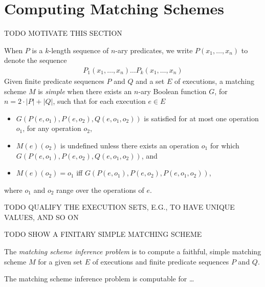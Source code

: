 \section{Computing Matching Schemes}
\label{sec:matching}

TODO MOTIVATE THIS SECTION

When $P$ is a $k$-length sequence of $n$-ary predicates, we write $P(x_1,
\ldots, x_n)$ to denote the sequence
\begin{align*}
  P_1(x_1, \ldots, x_n) \ldots P_k(x_1, \ldots, x_n)
\end{align*}
Given finite predicate sequences $P$ and $Q$ and a set $E$ of executions, a
matching scheme $M$ is \emph{simple} when there exists an $n$-ary Boolean
function $G$, for $n = 2\cdot|P|+|Q|$, such that for each execution $e \in E$
\begin{itemize}

  \item $G(P(e,o_1),P(e,o_2),Q(e,o_1,o_2))$ is satisfied for at most one
  operation $o_1$, for any operation $o_2$,

  \item $M(e)(o_2)$ is undefined unless there exists an operation $o_1$
  for which $G(P(e,o_1),P(e,o_2),Q(e,o_1,o_2))$, and

  \item $M(e)(o_2) = o_1$ if{f} $G(P(e,o_1),P(e,o_2),P(e,o_1,o_2))$,

\end{itemize}
where $o_1$ and $o_2$ range over the operations of $e$.

TODO QUALIFY THE EXECUTION SETS, E.G., TO HAVE UNIQUE VALUES, AND SO ON

\begin{example}

  TODO SHOW A FINITARY SIMPLE MATCHING SCHEME
  
\end{example}

\begin{definition}

  The \emph{matching scheme inference problem} is to compute a faithful, simple
  matching scheme $M$ for a given set $E$ of executions and finite predicate
  sequences $P$ and $Q$.

\end{definition}

\begin{theorem}

  The matching scheme inference problem is computable for \ldots

\end{theorem}

